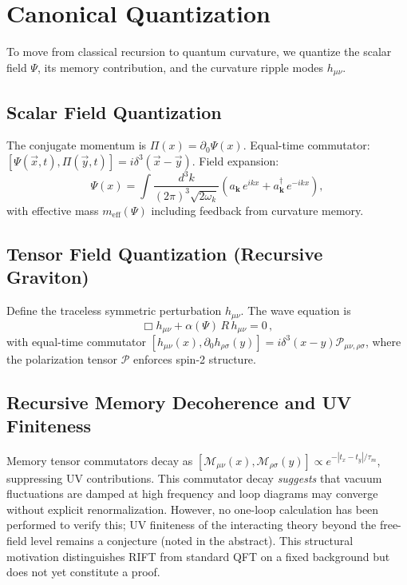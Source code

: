 \documentclass[12pt,a4paper]{article}
\begin{document}
\section{Canonical Quantization}
\label{sec:quantization}

To move from classical recursion to quantum curvature, we quantize the scalar
field $\Psi$, its memory contribution, and the curvature ripple modes $h_{\mu\nu}$.

\subsection{Scalar Field Quantization}

The conjugate momentum is $\Pi(x) = \partial_0\Psi(x)$.
Equal-time commutator: $[\Psi(\vec{x},t), \Pi(\vec{y},t)] = i\delta^3(\vec{x}-\vec{y})$.
Field expansion:
\begin{equation}
\Psi(x) = \int \frac{d^3k}{(2\pi)^3\sqrt{2\omega_k}}
\left(a_{\mathbf{k}}\,e^{ikx} + a^\dagger_{\mathbf{k}}\,e^{-ikx}\right),
\end{equation}
with effective mass $m_{\mathrm{eff}}(\Psi)$ including feedback from curvature memory.

\subsection{Tensor Field Quantization (Recursive Graviton)}

Define the traceless symmetric perturbation $h_{\mu\nu}$. The wave equation is
\begin{equation}
\Box h_{\mu\nu} + \alpha(\Psi)\,R\,h_{\mu\nu} = 0\,,
\end{equation}
with equal-time commutator
$[h_{\mu\nu}(x), \partial_0 h_{\rho\sigma}(y)] = i\delta^3(x-y)\mathcal{P}_{\mu\nu,\rho\sigma}$,
where the polarization tensor $\mathcal{P}$ enforces spin-2 structure.

\subsection{Recursive Memory Decoherence and UV Finiteness}

Memory tensor commutators decay as
$[\mathcal{M}_{\mu\nu}(x),\mathcal{M}_{\rho\sigma}(y)] \propto e^{-|t_x-t_y|/\tau_m}$,
suppressing UV contributions. This commutator decay \emph{suggests} that vacuum
fluctuations are damped at high frequency and loop diagrams may converge without
explicit renormalization. However, no one-loop calculation has been performed to
verify this; UV finiteness of the interacting theory beyond the free-field level
remains a conjecture (noted in the abstract). This structural motivation
distinguishes RIFT from standard QFT on a fixed background but does not
yet constitute a proof.
\end{document}
